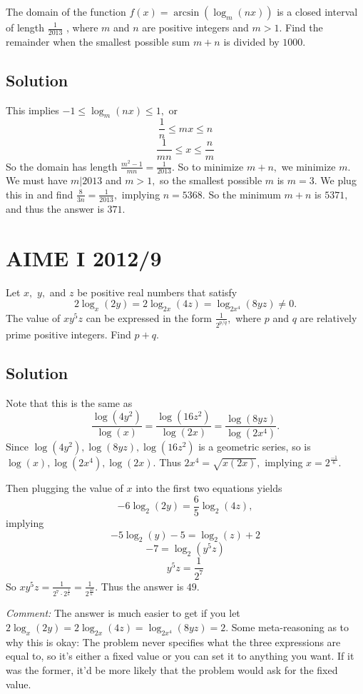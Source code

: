 \documentclass{article}
\begin{document}
The domain of the function $f(x) = \arcsin(\log_{m}(nx))$ is a closed interval of length $\frac{1}{2013}$ , where $m$ and $n$ are positive integers and $m>1$. Find the remainder when the smallest possible sum $m+n$ is divided by $1000.$

\subsection{Solution}

This implies $-1\leq \log_m(nx)\leq 1,$ or
    \[\frac{1}{n}\leq mx\leq n\]
    \[\frac{1}{mn}\leq x\leq \frac{n}{m}\]
    So the domain has length $\frac{m^2-1}{mn}=\frac{1}{2013}.$ So to minimize $m+n,$ we minimize $m.$ We must have $m|2013$ and $m>1,$ so the smallest possible $m$ is $m=3.$ We plug this in and find $\frac{8}{3n}=\frac{1}{2013},$ implying $n=5368.$ So the minimum $m+n$ is $5371,$ and thus the answer is $371.$

\pagebreak\section{AIME I 2012/9}

Let $x,$ $y,$ and $z$ be positive real numbers that satisfy \[2\log_{x}(2y) = 2\log_{2x}(4z) = \log_{2x^4}(8yz) \ne 0.\] The value of $xy^5z$ can be expressed in the form $\frac{1}{2^{p/q}},$ where $p$ and $q$ are relatively prime positive integers. Find $p+q.$

\subsection{Solution}

Note that this is the same as
    \[\frac{\log(4y^2)}{\log(x)}=\frac{\log(16z^2)}{\log(2x)}=\frac{\log(8yz)}{\log(2x^4)}.\]
    Since $\log(4y^2),\log(8yz),\log(16z^2)$ is a geometric series, so is $\log(x),\log(2x^4),\log(2x).$ Thus $2x^4=\sqrt{x(2x)},$ implying $x=2^{\frac{-1}{6}}.$
    
    Then plugging the value of $x$ into the first two equations yields
    \[-6\log_{2}(2y)=\frac{6}{5}\log_{2}(4z),\]
    implying
    \[-5\log_{2}(y)-5=\log_{2}(z)+2\]
    \[-7=\log_{2}(y^5z)\]
    \[y^5z=\frac{1}{2^7}\]
    So $xy^5z=\frac{1}{2^7\cdot 2^{\frac{1}{6}}}=\frac{1}{2^{\frac{43}{6}}}.$ Thus the answer is $49.$
    
\textit{Comment:} The answer is much easier to get if you let $2\log_{x}(2y) = 2\log_{2x}(4z) = \log_{2x^4}(8yz)=2.$ Some meta-reasoning as to why this is okay: The problem never specifies what the three expressions are equal to, so it's either a fixed value or you can set it to anything you want. If it was the former, it'd be more likely that the problem would ask for the fixed value.
\end{document}
